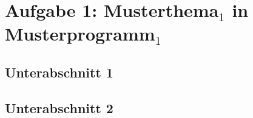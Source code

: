 \section{Aufgabe 1: Musterthema$_1$ in Musterprogramm$_1$}
\subsection{Unterabschnitt 1}
\vspace{1cm}
\subsection{Unterabschnitt 2}